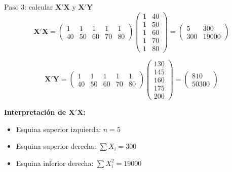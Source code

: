 \documentclass[aspectratio=169, 11pt]{beamer}
\begin{document}
\begin{frame}{Paso 3: calcular $\mathbf{X}'\mathbf{X}$ y $\mathbf{X}'\mathbf{Y}$}
\small
\[
\mathbf{X}'\mathbf{X} = \begin{pmatrix} 1&1&1&1&1 \\ 40&50&60&70&80 \end{pmatrix} \begin{pmatrix} 1&40 \\ 1&50 \\ 1&60 \\ 1&70 \\ 1&80 \end{pmatrix} = \begin{pmatrix} 5 & 300 \\ 300 & 19000 \end{pmatrix}
\]

\[
\mathbf{X}'\mathbf{Y} = \begin{pmatrix} 1&1&1&1&1 \\ 40&50&60&70&80 \end{pmatrix} \begin{pmatrix} 130 \\ 145 \\ 160 \\ 175 \\ 200 \end{pmatrix} = \begin{pmatrix} 810 \\ 50300 \end{pmatrix}
\]

\vspace{0.2cm}
\textbf{Interpretación de $\mathbf{X}'\mathbf{X}$:}
\begin{itemize}\setlength{\itemsep}{0pt}
  \item Esquina superior izquierda: $n = 5$
  \item Esquina superior derecha: $\sum X_i = 300$
  \item Esquina inferior derecha: $\sum X_i^2 = 19000$
\end{itemize}
\end{frame}

\end{document}
